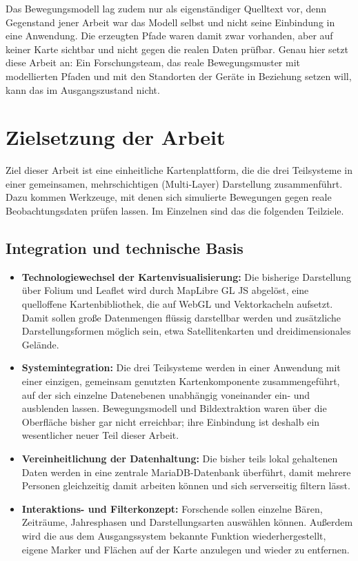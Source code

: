 \documentclass[12pt,a4paper]{report}
\begin{document}
Das Bewegungsmodell lag zudem nur als eigenständiger Quelltext vor, denn Gegenstand jener
Arbeit war das Modell selbst und nicht seine Einbindung in eine Anwendung. Die erzeugten
Pfade waren damit zwar vorhanden, aber auf keiner Karte sichtbar und nicht gegen die realen
Daten prüfbar. Genau hier setzt diese Arbeit an: Ein Forschungsteam, das reale
Bewegungsmuster mit modellierten Pfaden und mit den Standorten der Geräte in Beziehung
setzen will, kann das im Ausgangszustand nicht.

\section{Zielsetzung der Arbeit}
\label{sec:zielsetzung}

Ziel dieser Arbeit ist eine einheitliche Kartenplattform, die die drei Teilsysteme in einer
gemeinsamen, mehrschichtigen (Multi-Layer) Darstellung zusammenführt. Dazu kommen Werkzeuge,
mit denen sich simulierte Bewegungen gegen reale Beobachtungsdaten prüfen lassen. Im
Einzelnen sind das die folgenden Teilziele.

\subsection*{Integration und technische Basis}

\begin{itemize}
    \item \textbf{Technologiewechsel der Kartenvisualisierung:} Die bisherige Darstellung
    über Folium und Leaflet wird durch MapLibre GL JS abgelöst, eine quelloffene
    Kartenbibliothek, die auf WebGL und Vektorkacheln aufsetzt. Damit sollen große
    Datenmengen flüssig darstellbar werden und zusätzliche Darstellungsformen möglich sein,
    etwa Satellitenkarten und dreidimensionales Gelände.

    \item \textbf{Systemintegration:} Die drei Teilsysteme werden in einer Anwendung mit
    einer einzigen, gemeinsam genutzten Kartenkomponente zusammengeführt, auf der sich
    einzelne Datenebenen unabhängig voneinander ein- und ausblenden lassen. Bewegungsmodell
    und Bildextraktion waren über die Oberfläche bisher gar nicht erreichbar; ihre
    Einbindung ist deshalb ein wesentlicher neuer Teil dieser Arbeit.

    \item \textbf{Vereinheitlichung der Datenhaltung:} Die bisher teils lokal gehaltenen
    Daten werden in eine zentrale MariaDB-Datenbank überführt, damit mehrere Personen
    gleichzeitig damit arbeiten können und sich serverseitig filtern lässt.

    \item \textbf{Interaktions- und Filterkonzept:} Forschende sollen einzelne Bären,
    Zeiträume, Jahresphasen und Darstellungsarten auswählen können. Außerdem wird die aus
    dem Ausgangssystem bekannte Funktion wiederhergestellt, eigene Marker und Flächen auf
    der Karte anzulegen und wieder zu entfernen.
\end{itemize}
\end{document}
